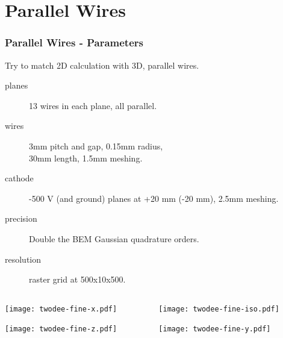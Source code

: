 \documentclass[xcolor=dvipsnames]{beamer}
\begin{document}


\section{Parallel Wires}



\begin{frame}
  \frametitle{Parallel Wires - Parameters}
  Try to match 2D calculation with 3D, parallel wires.

  \vspace{3mm}

  \begin{description}
  \item[planes] 13 wires in each plane, all parallel.
  \item[wires] 3mm pitch and gap, 0.15mm radius, \\30mm length, 1.5mm meshing.
  \item[cathode] -500 V (and ground) planes at +20 mm (-20 mm), 2.5mm meshing.
  \item[precision] Double the BEM Gaussian quadrature orders.
  \item[resolution] raster grid at 500x10x500.
  \end{description}
\end{frame}

\begin{frame}
  \begin{columns}
    \begin{column}{0.5\textwidth}
      \begin{center}
        \texttt{[image: twodee-fine-x.pdf]}

        \texttt{[image: twodee-fine-z.pdf]}
      \end{center}
    \end{column}
    \begin{column}{0.5\textwidth}
      \begin{center}
        \texttt{[image: twodee-fine-iso.pdf]}

        \texttt{[image: twodee-fine-y.pdf]}
      \end{center}
    \end{column}
  \end{columns}
\end{frame}
\end{document}
